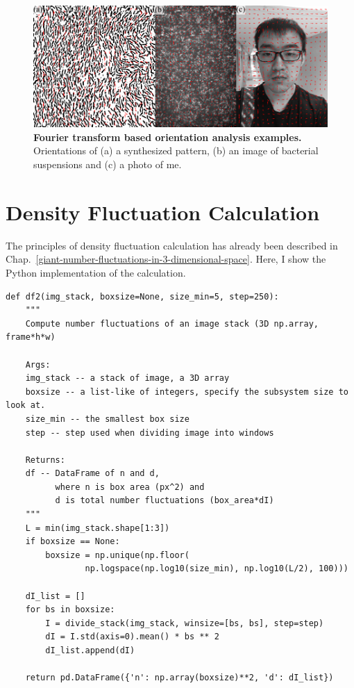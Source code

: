 \begin{figure}[h]
	\begin{center}
	\includegraphics[width=5.5in]{Figs/A-2/oft-gallery.pdf}
	\end{center}
	\caption[Fourier transform based orientation analysis examples]
	{
	\textbf{Fourier transform based orientation analysis examples.}
  Orientations of
  (a) a synthesized pattern,
  (b) an image of bacterial suspensions and
  (c) a photo of me.
	}
	\label{fig:oft-gallery}
\end{figure}

\section{Density Fluctuation Calculation}
The principles of density fluctuation calculation has already been described in Chap.~\ref{giant-number-fluctuations-in-3-dimensional-space}. Here, I show the Python implementation of the calculation.

\begin{verbatim}
def df2(img_stack, boxsize=None, size_min=5, step=250):
    """
    Compute number fluctuations of an image stack (3D np.array, frame*h*w)

    Args:
    img_stack -- a stack of image, a 3D array
    boxsize -- a list-like of integers, specify the subsystem size to look at.
    size_min -- the smallest box size
    step -- step used when dividing image into windows

    Returns:
    df -- DataFrame of n and d,
          where n is box area (px^2) and
          d is total number fluctuations (box_area*dI)
    """
    L = min(img_stack.shape[1:3])
    if boxsize == None:
        boxsize = np.unique(np.floor(
                np.logspace(np.log10(size_min), np.log10(L/2), 100)))

    dI_list = []
    for bs in boxsize:
        I = divide_stack(img_stack, winsize=[bs, bs], step=step)
        dI = I.std(axis=0).mean() * bs ** 2
        dI_list.append(dI)

    return pd.DataFrame({'n': np.array(boxsize)**2, 'd': dI_list})
\end{verbatim}
